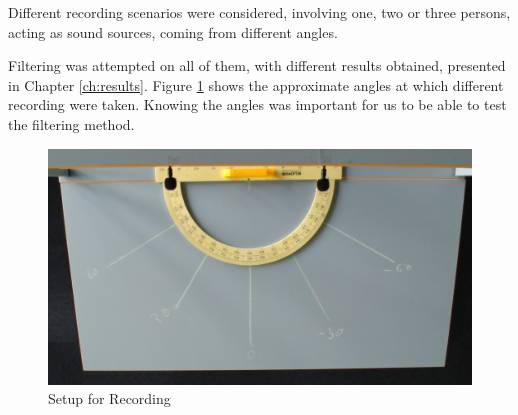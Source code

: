 Different recording scenarios were considered, involving one, two or three persons, acting as sound sources,
coming from different angles.

Filtering was attempted on all of them, with different results obtained, presented in Chapter \ref{ch:results}.
\newpage
Figure \ref{fig:recSetup} shows the approximate angles at which different recording were taken. Knowing the 
angles was important for us to be able to test the filtering method.
\begin{figure}[htp]
	\centering
	\includegraphics[width=1\textwidth]{Illustrations/JustSetup.jpg}
	\caption{Setup for Recording}
	\label{fig:recSetup}
\end{figure}



 

